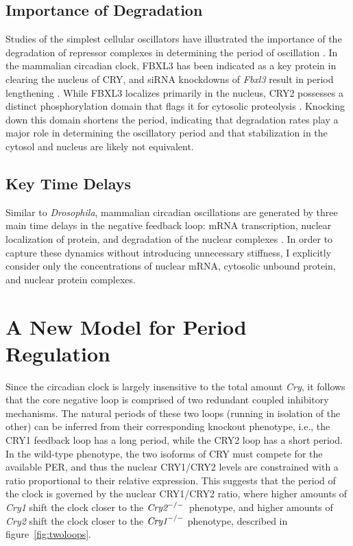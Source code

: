 \subsection{Importance of Degradation} Studies of the simplest cellular oscillators have illustrated the importance of the degradation of repressor complexes in determining the period of oscillation \cite{Cookson2009}. In the mammalian circadian clock, FBXL3 has been indicated as a key protein in clearing the nucleus of CRY, and siRNA knockdowns of {\it Fbxl3} result in period lengthening \cite{Zhang2009}. While FBXL3 localizes primarily in the nucleus, CRY2 possesses a distinct phosphorylation domain that flags it for cytosolic proteolysis \cite{Kurabayashi2010}. Knocking down this domain shortens the period, indicating that degradation rates play a major role in determining the oscillatory period and that stabilization in the cytosol and nucleus are likely not equivalent.

\subsection{Key Time Delays} Similar to {\it Drosophila}, mammalian circadian oscillations are generated by three main time delays in the negative feedback loop: mRNA transcription, nuclear localization of protein, and degradation of the nuclear complexes \cite{Vielhaber2000a}. In order to capture these dynamics without introducing unnecessary stiffness, I explicitly consider only the concentrations of nuclear mRNA, cytosolic unbound protein, and nuclear protein complexes.

\section{A New Model for Period Regulation}
Since the circadian clock is largely insensitive to the total amount {\it Cry}, it follows that the core negative loop is comprised of two redundant coupled inhibitory mechanisms. The natural periods of these two loops (running in isolation of the other) can be inferred from their corresponding knockout phenotype, i.e., the CRY1 feedback loop has a long period, while the CRY2 loop has a short period. In the wild-type phenotype, the two isoforms of CRY must compete for the available PER, and thus the nuclear CRY1/CRY2 levels are constrained with a ratio proportional to their relative expression. This suggests that the period of the clock is governed by the nuclear CRY1/CRY2 ratio, where higher amounts of {\it Cry1} shift the clock closer to the $\text{\it Cry2}^{-/-}$ phenotype, and higher amounts of {\it Cry2} shift the clock closer to the $\text{\it Cry1}^{-/-}$ phenotype, described in figure~\ref{fig:twoloops}.


